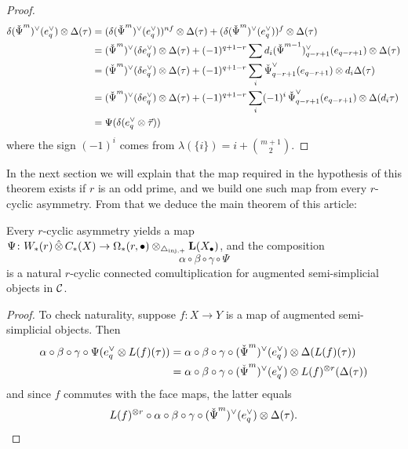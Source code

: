 \begin{proof}
	\begin{align*}
		\delta(\operatorname{\check{\Psi}}^m)^{\vee}(e_q^\vee)\otimes \Delta(\tau)
		&= (\delta(\operatorname{\check{\Psi}}^m)^{\vee}(e_q^\vee))^{nf}\otimes\Delta(\tau) + (\delta(\operatorname{\check{\Psi}}^m)^{\vee}(e_q^\vee))^{f}\otimes\Delta(\tau) \\
		&= (\operatorname{\check{\Psi}}^m)^{\vee}(\delta e_q^\vee)\otimes \Delta(\tau) + (-1)^{q+1-r}\sum d_i(\operatorname{\check{\Psi}}^{m-1})^\vee_{q-r+1}(e_{q-r+1})\otimes\Delta(\tau) \\
		&= (\operatorname{\check{\Psi}}^m)^{\vee}(\delta e_q^\vee)\otimes \Delta(\tau) + (-1)^{q+1-r}\sum_i \operatorname{\check{\Psi}}^\vee_{q-r+1}(e_{q-r+1})\otimes d_i\Delta(\tau) \\
        &= (\operatorname{\check{\Psi}}^m)^{\vee}(\delta e_q^\vee)\otimes \Delta(\tau) + (-1)^{q+1-r}\sum_i (-1)^i\operatorname{\check{\Psi}}^\vee_{q-r+1}(e_{q-r+1})\otimes \Delta(d_i\tau) \\
  &= \Psi(\delta(e_q^\vee\otimes \vec{\tau}))
	\end{align*}
 where the sign $(-1)^i$ comes from $\lambda(\{i\}) = i + \binom{m+1}{2}$.
\end{proof}




In the next section we will explain that the map required in the hypothesis of this theorem exists if $r$ is an odd prime, and we build one such map from every $r$-cyclic asymmetry. From that we deduce the main theorem of this article: 
\begin{theorem}\label{thm2:mainthm} Every $r$-cyclic asymmetry yields a map $\Psi\colon W_*(r)\operatorname{\hat{\otimes}} C_*(X)\to \Omega_*(r,\bullet)\otimes_{\triangle_{\mathrm{inj},+}} \operatorname{\mathbf{L}}(X_\bullet)$, and the composition
\[ \alpha\circ\beta\circ\gamma\circ \Psi
\]
is a natural $r$-cyclic connected comultiplication for augmented semi-simplicial objects in $\mathcal{C}$.
\end{theorem}
\begin{proof}
To check naturality, suppose $f\colon X\to Y$ is a map of augmented semi-simplicial objects. Then
\begin{align*}
    \alpha\circ\beta\circ\gamma\circ \Psi(e_q^\vee\otimes L(f)(\tau)) 
    &= \alpha\circ\beta\circ\gamma\circ(\operatorname{\check{\Psi}}^m)^\vee(e_q^\vee)\otimes \Delta(L(f)(\tau)) \\
    &= \alpha\circ\beta\circ\gamma\circ(\operatorname{\check{\Psi}}^m)^\vee(e_q^\vee)\otimes L(f)^{\otimes r}(\Delta(\tau))
\end{align*}
and since $f$ commutes with the face maps, the latter equals
\[
    L(f)^{\otimes r}\circ \alpha\circ\beta\circ\gamma\circ(\operatorname{\check{\Psi}}^m)^\vee(e_q^\vee)\otimes \Delta(\tau).\qedhere
\]
\end{proof}


